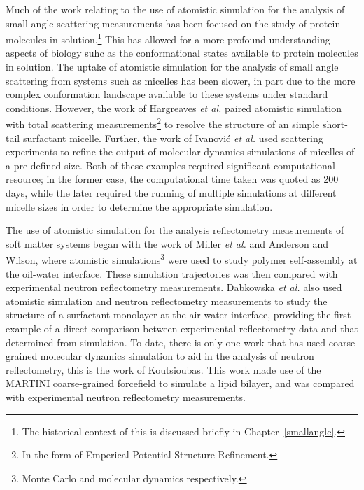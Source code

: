 Much of the work relating to the use of atomistic simulation for the analysis of small angle scattering measurements has been focused on the study of protein molecules in solution.\footnote{The historical context of this is discussed briefly in Chapter~\ref{smallangle}.}
This has allowed for a more profound understanding aspects of biology suhc as the conformational states available to protein molecules in solution.\autocite{bowerman_determining_2017}
The uptake of atomistic simulation for the analysis of small angle scattering from systems such as micelles has been slower, in part due to the more complex conformation landscape available to these systems under standard conditions.
However, the work of Hargreaves \emph{et al.} paired atomistic simulation with total scattering measurements\footnote{In the form of Emperical Potential Structure Refinement.} to resolve the structure of an simple short-tail surfactant micelle.\autocite{hargreaves_atomistic_2011}
Further, the work of Ivanovi\'{c} \emph{et al.} used scattering experiments to refine the output of molecular dynamics simulations of micelles of a pre-defined size.\autocite{ivanovic_temperature-dependent_2018}
Both of these examples required significant computational resource; in the former case, the computational time taken was quoted as 200 days, while the later required the running of multiple simulations at different micelle sizes in order to determine the appropriate simulation.

The use of atomistic simulation for the analysis reflectometry measurements of soft matter systems began with the work of Miller \emph{et al.} and Anderson and Wilson,\autocite{miller_monte_2003,anderson_molecular_2004} where atomistic simulations\footnote{Monte Carlo and molecular dynamics respectively.} were used to study polymer self-assembly at the oil-water interface.
These simulation trajectories was then compared with experimental neutron reflectometry measurements.
Dabkowska \emph{et al.} also used atomistic simulation and neutron reflectometry measurements to study the structure of a surfactant monolayer at the air-water interface, providing the first example of a direct comparison between experimental reflectometry data and that determined from simulation.\autocite{dabkowska_modulation_2014}
To date, there is only one work that has used coarse-grained molecular dynamics simulation to aid in the analysis of neutron reflectometry, this is the work of Koutsioubas.\autocite{koutsioubas_combined_2016}
This work made use of the MARTINI coarse-grained forcefield to simulate a lipid bilayer, and was compared with experimental neutron reflectometry measurements.
